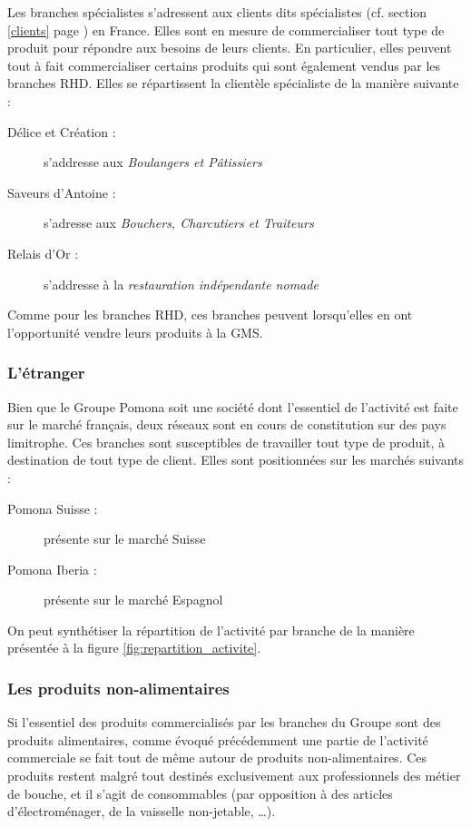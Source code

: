                 Les branches spécialistes s'adressent aux clients dits spécialistes (cf. section \ref{clients} page \pageref{clients}) en France.
                Elles sont en mesure de commercialiser tout type de produit pour répondre aux besoins de leurs clients.
                En particulier, elles peuvent tout à fait commercialiser certains produits qui sont également vendus par les branches RHD.
                Elles se répartissent la clientèle spécialiste de la manière suivante :
                \begin{description}
                    \item[Délice et Création :] s'addresse aux \emph{Boulangers et Pâtissiers}
                    \item[Saveurs d'Antoine :] s'adresse aux \emph{Bouchers, Charcutiers et Traiteurs}
                    \item[Relais d'Or :] s'addresse à la \emph{restauration indépendante nomade}
                \end{description}
                Comme pour les branches RHD, ces branches peuvent lorsqu'elles en ont l'opportunité vendre leurs produits à la GMS.

                \subsubsection{L'étranger}

                Bien que le Groupe Pomona soit une société dont l'essentiel de l'activité est faite sur le marché français, deux réseaux sont en cours de constitution sur des pays limitrophe.
                Ces branches sont susceptibles de travailler tout type de produit, à destination de tout type de client.
                Elles sont positionnées sur les marchés suivants : 
                \begin{description}
                    \item[Pomona Suisse :] présente sur le marché Suisse
                    \item[Pomona Iberia :] présente sur le marché Espagnol 
                \end{description}

                On peut synthétiser la répartition de l'activité par branche de la manière présentée à la figure \ref{fig:repartition_activite}.

                \subsubsection{Les produits non-alimentaires}
                \label{produits_nonal}
                Si l'essentiel des produits commercialisés par les branches du Groupe sont des produits alimentaires, comme évoqué précédemment une partie de l'activité commerciale se fait tout de même autour de produits non-alimentaires.
                Ces produits restent malgré tout destinés exclusivement aux professionnels des métier de bouche, et il s'agit de consommables (par opposition à des articles d'électroménager, de la vaisselle non-jetable, \dots).

